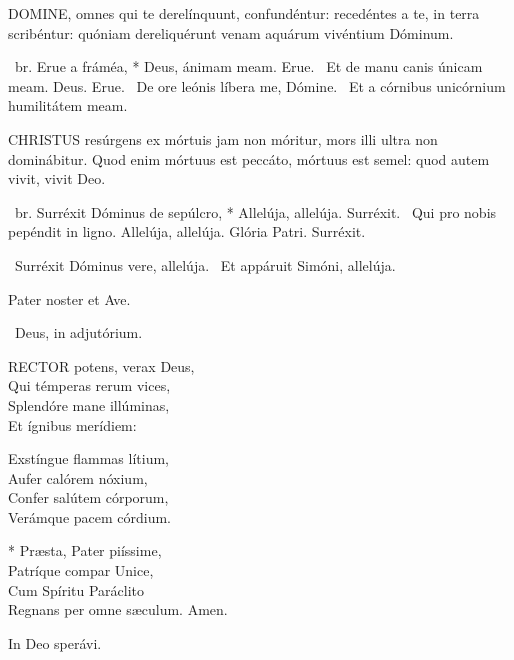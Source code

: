 
\lettrine[lines=2]{D}{OMINE}, omnes qui te derelínquunt, confundéntur: recedéntes a te, in terra scribéntur: quóniam dereliquérunt venam aquárum vivéntium Dóminum.

\R\ br. Erue a fráméa, * Deus, ánimam meam. Erue. \V\ Et de manu canis únicam meam. Deus. Erue. \V\ De ore leónis líbera me, Dómine. \R\ Et a córnibus unicórnium humilitátem meam.




\lettrine[lines=2]{C}{HRISTUS} resúrgens ex mórtuis jam non móritur, mors illi ultra non dominábitur. Quod enim mórtuus est peccáto, mórtuus est semel: quod autem vivit, vivit Deo.

\R\ br. Surréxit Dóminus de sepúlcro, * Allelúja, allelúja. Surréxit. \V\ Qui pro nobis pepéndit in ligno. Allelúja, allelúja. Glória Patri. Surréxit.

\V\ Surréxit Dóminus vere, allelúja. \R\ Et appáruit Simóni, allelúja.


\sectionornament


Pater noster et Ave.

\V\ Deus, in adjutórium.


\lettrine[lines=2]{R}{ECTOR} potens, verax Deus,\\
Qui témperas rerum vices,\\
Splendóre mane illúminas,\\
Et ígnibus merídiem:

Exstíngue flammas lítium,\\
Aufer calórem nóxium,\\
Confer salútem córporum,\\
Verámque pacem córdium.

* Præsta, Pater piíssime,\\
Patríque compar Unice,\\
Cum Spíritu Paráclito\\
Regnans per omne sæculum. Amen.

  In Deo sperávi.


